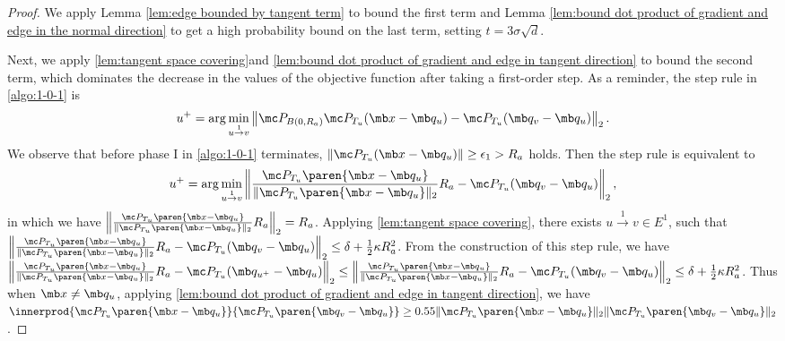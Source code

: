 \begin{proof}
We apply Lemma \ref{lem:edge bounded by tangent term} to bound the first term and Lemma \ref{lem:bound dot product of gradient and edge in the normal direction} to get a high probability bound on the last term, setting $t = 3\sigma\sqrt{d}$. 



Next, we apply \cref{lem:tangent space covering}and \cref{lem:bound dot product of gradient and edge in tangent direction} to bound the second term, which dominates the decrease in the values of the objective function after taking a first-order step. As a reminder, the step rule in \cref{algo:1-0-1} is 
\begin{equation}
    u^+ = \arg\min_{u \overset{1}{\rightarrow} v}
     \left\| \mc P_{B(0,R_a)} \mc P_{T_u} (\mb x -\mb q_u) - \mc P_{T_u} (\mb q_v - \mb q_u) \right\|_2.
\end{equation}
We observe that before phase I in \cref{algo:1-0-1} terminates, $\left\|\mc P_{T_u} (\mb x -\mb q_u)\right\| \ge \epsilon_1 > R_a$ holds. Then the step rule is equivalent to 
\begin{equation}
    u^+ = \arg\min_{u \overset{1}{\rightarrow} v}
     \left\| \frac{\mc P_{T_u} \paren{\mb x - \mb q_u}}{\| \mc P_{T_u} \paren{\mb x - \mb q_u}\|_2} R_a - \mc P_{T_u} (\mb q_v - \mb q_u) \right\|_2,
\end{equation}
in which we have $\left\|\frac{\mc P_{T_u} \paren{\mb x - \mb q_u}}{\| \mc P_{T_u} \paren{\mb x - \mb q_u}\|_2} R_a\right\|_2 = R_a$. Applying \cref{lem:tangent space covering}, there exists $u \overset{1}{\rightarrow} v \in E^1$, such that $\left\| \frac{\mc P_{T_u} \paren{\mb x - \mb q_u}}{\| \mc P_{T_u} \paren{\mb x - \mb q_u}\|_2} R_a - \mc P_{T_u}(\mb q_v - \mb q_u)\right\|_2 \leq \delta + \frac{1}{2}\kappa R_a^2$. From the construction of this step rule, we have  $\left\| \frac{\mc P_{T_u} \paren{\mb x - \mb q_u}}{\| \mc P_{T_u} \paren{\mb x - \mb q_u}\|_2} R_a - \mc P_{T_u}(\mb q_{u^+} - \mb q_u)\right\|_2 \leq \left\| \frac{\mc P_{T_u} \paren{\mb x - \mb q_u}}{\| \mc P_{T_u} \paren{\mb x - \mb q_u}\|_2} R_a - \mc P_{T_u}(\mb q_v - \mb q_u)\right\|_2 \leq \delta + \frac{1}{2}\kappa R_a^2$. Thus when $\mb x \neq \mb q_u$, applying \cref{lem:bound dot product of gradient and edge in tangent direction}, we have $\innerprod{\mc P_{T_u} \paren{\mb x - \mb q_u}}{\mc P_{T_u}\paren{\mb q_v - \mb q_u}} \ge 0.55 \| \mc P_{T_u} \paren{\mb x - \mb q_u} \|_2   \| \mc P_{T_u}\paren{\mb q_v - \mb q_u} \|_2$.






\end{proof}
